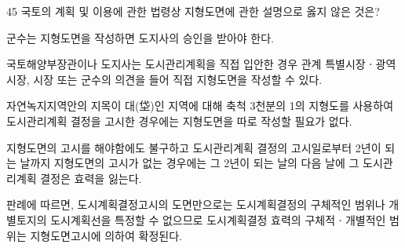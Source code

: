 \begin{question}{45}
국토의 계획 및 이용에 관한 법령상 지형도면에 관한 설명으로 옳지 않은 것은?
\begin{choices}
  \item 군수는 지형도면을 작성하면 도지사의 승인을 받아야 한다.
  \item 국토해양부장관이나 도지사는 도시관리계획을 직접 입안한 경우 관계 특별시장ㆍ광역시장, 시장 또는 군수의 의견을 들어 직접 지형도면을 작성할 수 있다.
  \item 자연녹지지역안의 지목이 대(垈)인 지역에 대해 축척 3천분의 1의 지형도를 사용하여 도시관리계획 결정을 고시한 경우에는 지형도면을 따로 작성할 필요가 없다.
  \item 지형도면의 고시를 해야함에도 불구하고 도시관리계획 결정의 고시일로부터 2년이 되는 날까지 지형도면의 고시가 없는 경우에는 그 2년이 되는 날의 다음 날에 그 도시관리계획 결정은 효력을 잃는다.
  \item 판례에 따르면, 도시계획결정고시의 도면만으로는 도시계획결정의 구체적인 범위나 개별토지의 도시계획선을 특정할 수 없으므로 도시계획결정 효력의 구체적ㆍ개별적인 범위는 지형도면고시에 의하여 확정된다.
\end{choices}
\end{question}
